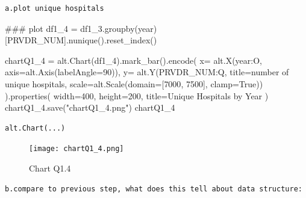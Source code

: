 \documentclass[
  letterpaper,
  DIV=11,
  numbers=noendperiod]{scrartcl}
\newenvironment{Shaded}{\begin{snugshade}}{\end{snugshade}}
\newcommand{\CommentTok}[1]{\textcolor[rgb]{0.37,0.37,0.37}{#1}}
\newcommand{\DecValTok}[1]{\textcolor[rgb]{0.68,0.00,0.00}{#1}}
\newcommand{\NormalTok}[1]{\textcolor[rgb]{0.00,0.23,0.31}{#1}}
\newcommand{\OperatorTok}[1]{\textcolor[rgb]{0.37,0.37,0.37}{#1}}
\newcommand{\StringTok}[1]{\textcolor[rgb]{0.13,0.47,0.30}{#1}}
\newcommand{\VariableTok}[1]{\textcolor[rgb]{0.07,0.07,0.07}{#1}}
\begin{document}
\begin{verbatim}
a.plot unique hospitals
\end{verbatim}

\begin{Shaded}
\begin{Highlighting}[]
\CommentTok{\#\#\# plot}
\NormalTok{df1\_4 }\OperatorTok{=}\NormalTok{ df1\_3.groupby(}\StringTok{\textquotesingle{}year\textquotesingle{}}\NormalTok{)[}\StringTok{\textquotesingle{}PRVDR\_NUM\textquotesingle{}}\NormalTok{].nunique().reset\_index()}

\NormalTok{chartQ1\_4 }\OperatorTok{=}\NormalTok{ alt.Chart(df1\_4).mark\_bar().encode(}
\NormalTok{    x}\OperatorTok{=}\NormalTok{ alt.X(}\StringTok{\textquotesingle{}year:O\textquotesingle{}}\NormalTok{, axis}\OperatorTok{=}\NormalTok{alt.Axis(labelAngle}\OperatorTok{=}\DecValTok{90}\NormalTok{)),}
\NormalTok{    y}\OperatorTok{=}\NormalTok{ alt.Y(}\StringTok{\textquotesingle{}PRVDR\_NUM:Q\textquotesingle{}}\NormalTok{, title}\OperatorTok{=}\StringTok{\textquotesingle{}number of unique hospitals\textquotesingle{}}\NormalTok{, scale}\OperatorTok{=}\NormalTok{alt.Scale(domain}\OperatorTok{=}\NormalTok{[}\DecValTok{7000}\NormalTok{, }\DecValTok{7500}\NormalTok{], clamp}\OperatorTok{=}\VariableTok{True}\NormalTok{))}
\NormalTok{).properties(}
\NormalTok{    width}\OperatorTok{=}\DecValTok{400}\NormalTok{, }
\NormalTok{    height}\OperatorTok{=}\DecValTok{200}\NormalTok{, }
\NormalTok{    title}\OperatorTok{=}\StringTok{\textquotesingle{}Unique Hospitals by Year\textquotesingle{}}  
\NormalTok{)}
\NormalTok{chartQ1\_4.save(}\StringTok{"chartQ1\_4.png"}\NormalTok{)}
\NormalTok{chartQ1\_4}
\end{Highlighting}
\end{Shaded}

\begin{verbatim}
alt.Chart(...)
\end{verbatim}

\begin{figure}[H]

{\centering \texttt{[image: chartQ1\_4.png]}

}

\caption{Chart Q1.4}

\end{figure}%

\begin{verbatim}
b.compare to previous step, what does this tell about data structure:
\end{verbatim}
\end{document}

